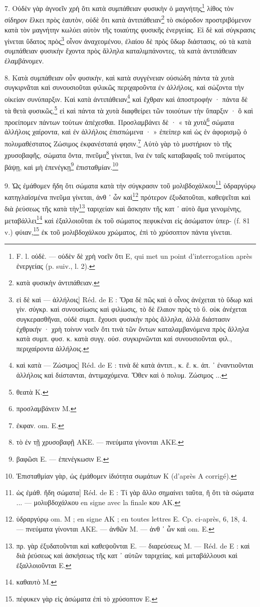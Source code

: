 \documentclass[a4paper, 11pt, oneside, polutonikogreek, french]{article}
\begin{document}
7. Οὐδὲν γὰρ ἀγνοεῖν χρὴ ὅτι κατὰ συμπάθειαν φυσικὴν ὁ μαγνήτης\footnote{F. l. οὐδὲ. --- οὐδὲν δὲ χρὴ νοεῖν ὅτι E, qui met un point d'interrogation après ἐνεργείας (p. suiv., l. 2).} λίθος τὸν σίδηρον ἕλκει πρὸς ἑαυτὸν, οὐδὲ ὅτι κατὰ ἀντιπάθειαν\footnote{κατὰ φυσικὴν ἀντιπάθειαν.} τὸ σκόροδον προστριβόμενον κατὰ τὸν μαγνήτην κωλύει αὐτὸν τῆς τοιαύτης φυσικῆς ἐνεργείας. Εἰ δὲ καὶ σύγκρασις γίνεται ὕδατος πρὸς\footnote{εἰ δὲ καὶ --- ἀλλήλοις] Réd. de E : Ὅρα δὲ πῶς καὶ ὁ οἶνος ἀνέχεται τὸ ὕδωρ καὶ γίν. σύγκρ. καὶ συνουσίωσις καὶ φιλίωσις, τὸ δὲ ἔλαιον πρὸς τὸ ὕ. οὐκ ἀνέχεται συγκερασθῆναι, οὐδὲ συμπ. ἔχουσι φυσικὴν πρὸς ἄλληλα, ἀλλὰ διάστασιν ἐχθρικήν · χρὴ τοίνυν νοεῖν ὅτι τινὰ τῶν ὄντων καταλαμβανόμενα πρὸς ἄλληλα κατὰ συμπ. φυσ. κ. κατὰ συγγ. οὐσ. συγκιρνῶνται καὶ συνουσιοῦνται φιλ., περιχαίροντα ἀλλήλοις.} οἶνον ἀναχεομένου, ἐλαίου δὲ πρὸς ὕδωρ διάστασις, οὐ τὰ κατὰ συμπάθειαν φυσικὴν ἔχοντα πρὸς ἄλληλα καταλιμπάνοντες, τὰ κατὰ ἀντιπάθειαν ἐλαμβάνομεν.

8. Κατὰ συμπάθειαν οὖν φυσικὴν, καὶ κατὰ συγγένειαν οὐσιώδη πάντα τὰ χυτὰ συγκιρνᾶται καὶ συνουσιοῦται φιλικῶς περιχαροῦντα ἐν ἀλλήλοις, καὶ σώζοντα τὴν οἰκείαν συνύπαρξιν. Καὶ κατὰ ἀντιπάθειαν\footnote{καὶ κατὰ --- Ζώσιμος] Réd. de E : τινὰ δὲ κατὰ ἀντιπ., κ. ἔ. κ. ἀπ. ᾽ ἐναντιοῦνται ἀλλήλοις καὶ διίστανται, ἀντιμαχόμενα. Ὅθεν καὶ ὁ πολυμ. Ζώσιμος ...} καὶ ἔχθραν καὶ ἀποστροφήν · πάντα δὲ τὰ θετὰ φυσικῶς,\footnote{θεατὰ K.} εἰ καὶ πάντα τὰ χυτὰ διαφθείρει τῶν τοιούτων τὴν ὕπαρξιν · ὃ καὶ προείπομεν πάντων τούτων ἀπέχεσθαι. Προσλαμβάνει δὲ · « τὰ χυτὰ\footnote{προσλαμβάνειν M.} σώματα ἀλλήλοις χαίροντα, καὶ ἐν ἀλλήλοις ἐπισπώμενα · » ἐπείπερ καὶ ὡς ἐν ἀφορισμῷ ὁ πολυμαθέστατος Ζώσιμος ἐκφανέστατά φησιν.\footnote{ἐκφαν. om. E.} Αὐτὸ γὰρ τὸ μυστήριον τὸ τῆς χρυσοβαφῆς, σώματα ὄντα, πνεῦμα\footnote{τὸ ἐν τῇ χρυσοβαφῇ AKE. --- πνεύματα γίνονται AKE.} γίνεται, ἵνα ἐν ταῖς καταβαφαῖς τοῦ πνεύματος βάψῃ, καὶ μὴ ἐπενέγκῃ\footnote{βαφῶσι E. --- ἐπενέγκωσιν E.} ἐπισταθμίαν.\footnote{Ἐπισταθμίαν γὰρ, ὡς ἐμάθομεν ἰδιότητα σωμάτων K (d'après A corrigé).}

9. Ὡς ἐμάθομεν ἤδη ὅτι σώματα κατὰ τὴν σύγκρασιν τοῦ μολιβδοχάλκου\footnote{ὡς ἐμάθ. ἤδη σώματα] Réd. de E : Τί γὰρ ἄλλο σημαίνει ταῦτα, ἢ ὅτι τὰ σώματα ... --- μολυβδοχάλκου en signe avec la finale κου AK.} ὑδραργύρῳ κατηγλαϊσμένα πνεῦμα γίνεται, ἀνθ ᾽ ὧν καὶ\footnote{ὑδραργύρῳ om. M ; en signe AK ; en toutes lettres E. Cp. ci-après, 6, 18, 4. --- πνεύματα γίνονται AKE. --- ἀνθῶν M. --- ἀνθ ᾽ ὧν καὶ om. E.} πρότερον ἐξυδατοῦται, καθεψεῖται καὶ διὰ ῥεύσεως τῆς κατὰ τὴν\footnote{πρ. γὰρ ἐξυδατοῦνται καὶ καθεψοῦνται E. --- διαρεύσεως M. --- Réd. de E : καὶ διὰ ῥεύσεως καὶ ἀσκήσεως τῆς κατ ᾽ αὐτῶν ταριχείας, καὶ μεταβάλλουσι καὶ ἐξαλλοιοῦνται E.} ταριχείαν καὶ ἄσκησιν τῆς κατ ᾽ αὐτὸ ἅμα γενομένης, μεταβάλλει\footnote{καθαυτὸ M.} καὶ ἐξαλλοιοῦται ἐκ τοῦ σώματος πεφυκέναι εἰς ἀσώματον ὑπερ- (f. 81 v.) φύιαν,\footnote{πέφυκεν γὰρ εἰς ἀσώματα ἐπὶ τὸ χρύσοπτον E.} ἐκ τοῦ μολιβδοχάλκου χρώματος, ἐπὶ τὸ χρύσοπτον πάντα γίνεται.
\end{document}
